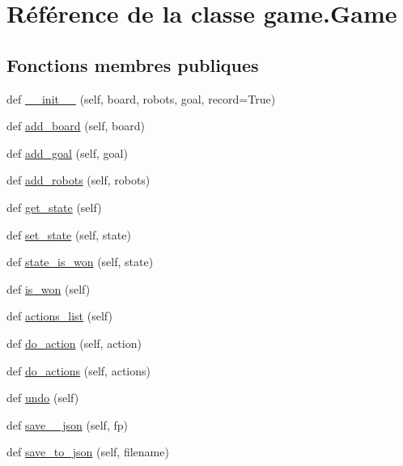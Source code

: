 \hypertarget{classgame_1_1Game}{}\section{Référence de la classe game.\+Game}
\label{classgame_1_1Game}
\subsection*{Fonctions membres publiques}
\begin{DoxyCompactItemize}
\item 
def \hyperlink{classgame_1_1Game_af5743a4c7beabed4dd5dea74a39bbb99}{\+\_\+\+\_\+init\+\_\+\+\_\+} (self, board, robots, goal, record=True)
\item 
def \hyperlink{classgame_1_1Game_a2ccf23306726654420eec1a50f67d1cb}{add\+\_\+board} (self, board)
\item 
def \hyperlink{classgame_1_1Game_a7465d51560b2d485db6ed53907cf1397}{add\+\_\+goal} (self, goal)
\item 
def \hyperlink{classgame_1_1Game_a7e642c0246cea6fa82e92247fa4c3b93}{add\+\_\+robots} (self, robots)
\item 
def \hyperlink{classgame_1_1Game_aaa2b3e9d8578764bc3eda7ab5841ecbb}{get\+\_\+state} (self)
\item 
def \hyperlink{classgame_1_1Game_a7e87798fb7f81b80c11fcaec17860577}{set\+\_\+state} (self, state)
\item 
def \hyperlink{classgame_1_1Game_a9ae72edd1264e1effe875ec1af8051f9}{state\+\_\+is\+\_\+won} (self, state)
\item 
def \hyperlink{classgame_1_1Game_a0fc708c9734c5a42e3461188580efcd1}{is\+\_\+won} (self)
\item 
def \hyperlink{classgame_1_1Game_a485f03c6330c2bb3284638de65b6cae0}{actions\+\_\+list} (self)
\item 
def \hyperlink{classgame_1_1Game_a2c3428bb9f61284ee0febe00d7850dfa}{do\+\_\+action} (self, action)
\item 
def \hyperlink{classgame_1_1Game_a62f9d3a23be4b342ee35e56cdaf073a3}{do\+\_\+actions} (self, actions)
\item 
def \hyperlink{classgame_1_1Game_a4d05280a8e739b214f50168a7f60c782}{undo} (self)
\item 
def \hyperlink{classgame_1_1Game_a2d8234f8916943384bf5f756b616fe55}{save\+\_\+\_\+json} (self, fp)
\item 
def \hyperlink{classgame_1_1Game_a7c525e5a47b01fb5bed17fe1438c13f5}{save\+\_\+to\+\_\+json} (self, filename)
\end{DoxyCompactItemize}
